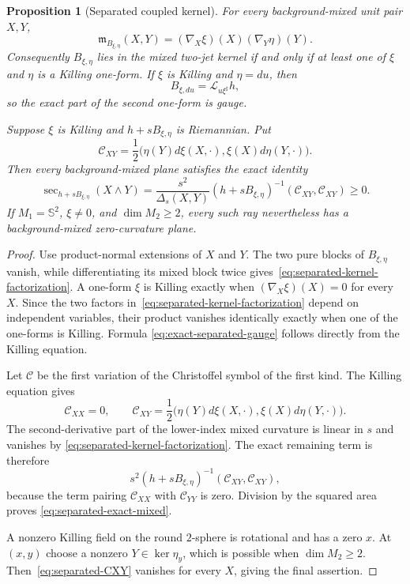 \documentclass[11pt]{amsart}
\newtheorem{proposition}[theorem]{Proposition}
\theoremstyle{definition}
\theoremstyle{remark}
\DeclareMathOperator{\secop}{sec}
\newcommand{\Sph}{\mathbb S}
\begin{document}
\begin{proposition}[Separated coupled kernel]
\label{prop:separated-kernel}
For every background-mixed unit pair $X,Y$,
\begin{equation}\label{eq:separated-kernel-factorization}
 \mathfrak m_{B_{\xi,\eta}}(X,Y)
 =(\nabla_X\xi)(X)(\nabla_Y\eta)(Y).
\end{equation}
Consequently $B_{\xi,\eta}$ lies in the mixed two-jet kernel if and
only if at least one of $\xi$ and $\eta$ is a Killing one-form.
If $\xi$ is Killing and $\eta=du$, then
\begin{equation}\label{eq:exact-separated-gauge}
 B_{\xi,du}=\mathcal L_{u\xi^\sharp}h,
\end{equation}
so the exact part of the second one-form is gauge.

Suppose $\xi$ is Killing and $h+sB_{\xi,\eta}$ is Riemannian.  Put
\begin{equation}\label{eq:separated-CXY}
 \mathcal C_{XY}
 =\frac12\bigl(\eta(Y)d\xi(X,\cdot),
                 \xi(X)d\eta(Y,\cdot)\bigr).
\end{equation}
Then every background-mixed plane satisfies the exact identity
\begin{equation}\label{eq:separated-exact-mixed}
 \secop_{h+sB_{\xi,\eta}}(X\wedge Y)
 =\frac{s^2}{\Delta_s(X,Y)}
  (h+sB_{\xi,\eta})^{-1}(\mathcal C_{XY},\mathcal C_{XY})
 \geq0.
\end{equation}
If $M_1=\Sph^2$, $\xi\neq0$, and $\dim M_2\geq2$, every such ray
nevertheless has a background-mixed zero-curvature plane.
\end{proposition}

\begin{proof}
Use product-normal extensions of $X$ and $Y$.  The two pure blocks of
$B_{\xi,\eta}$ vanish, while differentiating its mixed block twice
gives~\eqref{eq:separated-kernel-factorization}.  A one-form $\xi$ is
Killing exactly when $(\nabla_X\xi)(X)=0$ for every $X$.  Since the
two factors in~\eqref{eq:separated-kernel-factorization} depend on
independent variables, their product vanishes identically exactly when
one of the one-forms is Killing.  Formula
\eqref{eq:exact-separated-gauge} follows directly from the Killing
equation.

Let $\mathcal C$ be the first variation of the Christoffel symbol of
the first kind.  The Killing equation gives
\[
 \mathcal C_{XX}=0,
 \qquad
 \mathcal C_{XY}
 =\frac12\bigl(\eta(Y)d\xi(X,\cdot),
                 \xi(X)d\eta(Y,\cdot)\bigr).
\]
The second-derivative part of the lower-index mixed curvature is
linear in $s$ and vanishes by
\eqref{eq:separated-kernel-factorization}.  The exact remaining term
is therefore
\[
 s^2(h+sB_{\xi,\eta})^{-1}(\mathcal C_{XY},\mathcal C_{XY}),
\]
because the term pairing $\mathcal C_{XX}$ with
$\mathcal C_{YY}$ is zero.  Division by the squared area proves
\eqref{eq:separated-exact-mixed}.

A nonzero Killing field on the round $2$-sphere is rotational and has
a zero $x$.  At $(x,y)$ choose a nonzero $Y\in\ker\eta_y$, which is
possible when $\dim M_2\geq2$.  Then~\eqref{eq:separated-CXY} vanishes
for every $X$, giving the final assertion.
\end{proof}
\end{document}
